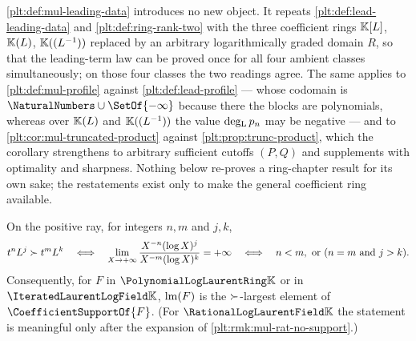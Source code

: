 \begin{remark}
\label{plt:rmk:mul-leading-restated}
\cref{plt:def:mul-leading-data} introduces no new object.  It repeats
\cref{plt:def:lead-leading-data} and \cref{plt:def:ring-rank-two} with the
three coefficient rings $\mathbb{K}[L]$, $\mathbb{K}(L)$, $\mathbb{K}((L^{-1}))$ replaced by an
arbitrary logarithmically graded domain $R$, so that the leading-term law can
be proved once for all four ambient classes simultaneously; on those four
classes the two readings agree.  The same applies to
\cref{plt:def:mul-profile} against \cref{plt:def:lead-profile} --- whose
codomain is $\NaturalNumbers\cup\SetOf{-\infty}$ because there the blocks are
polynomials, whereas over $\mathbb{K}(L)$ and $\mathbb{K}((L^{-1}))$ the value $\operatorname{deg_{L}} p_n$ may
be negative --- and to \cref{plt:cor:mul-truncated-product} against
\cref{plt:prop:trunc-product}, which the corollary strengthens to arbitrary
sufficient cutoffs $(P,Q)$ and supplements with optimality and sharpness.
Nothing below re-proves a ring-chapter result for its own sake; the
restatements exist only to make the general coefficient ring available.
\end{remark}

\begin{lemma}
\label{plt:lem:mul-dominance}
On the positive ray, for integers $n,m$ and $j,k$,
\[
 t^nL^j\succ t^mL^k
 \quad\Longleftrightarrow\quad
 \lim_{X\to+\infty}\frac{X^{-n}(\log X)^j}{X^{-m}(\log X)^k}=+\infty
 \quad\Longleftrightarrow\quad
 n<m,\ \text{or}\ (n=m\ \text{and}\ j>k).
\]
Consequently, for $F$ in $\PLlau$ or in $\PLit$, $\operatorname{lm}(F)$ is the
$\succ$-largest element of $\CoefficientSupportOf{F}$.  (For $\PLrat$ the
statement is meaningful only after the expansion of
\cref{plt:rmk:mul-rat-no-support}.)
\end{lemma}

